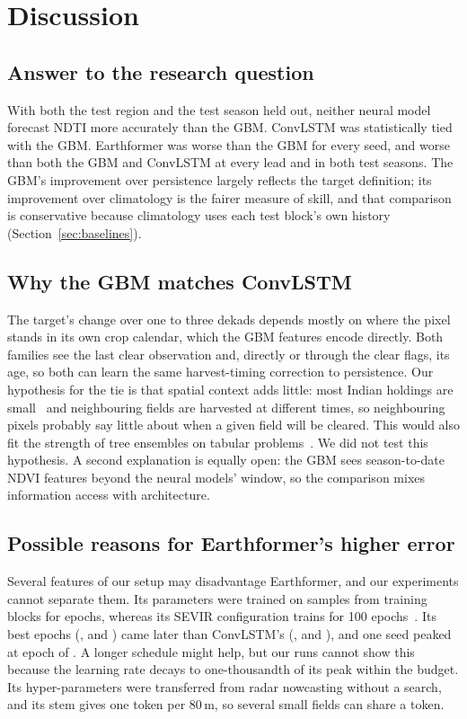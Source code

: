 \documentclass[journal]{IEEEtran}
\begin{document}
\section{Discussion}
\subsection{Answer to the research question}
With both the test region and the test season held out, neither neural model forecast NDTI more accurately than the GBM. ConvLSTM was statistically tied with the GBM. Earthformer was worse than the GBM for every seed, and worse than both the GBM and ConvLSTM at every lead and in both test seasons. The GBM's improvement over persistence largely reflects the target definition; its improvement over climatology is the fairer measure of skill, and that comparison is conservative because climatology uses each test block's own history (Section~\ref{sec:baselines}).

\subsection{Why the GBM matches ConvLSTM}
\label{sec:tie}
The target's change over one to three dekads depends mostly on where the pixel stands in its own crop calendar, which the GBM features encode directly. Both families see the last clear observation and, directly or through the clear flags, its age, so both can learn the same harvest-timing correction to persistence. Our hypothesis for the tie is that spatial context adds little: most Indian holdings are small~\cite{agcensus} and neighbouring fields are harvested at different times, so neighbouring pixels probably say little about when a given field will be cleared. This would also fit the strength of tree ensembles on tabular problems~\cite{grinsztajn}. We did not test this hypothesis. A second explanation is equally open: the GBM sees season-to-date NDVI features beyond the neural models' window, so the comparison mixes information access with architecture.

\subsection{Possible reasons for Earthformer's higher error}
\label{sec:ef}
Several features of our setup may disadvantage Earthformer, and our experiments cannot separate them. Its \finEarthformerSeedOneParams{} parameters were trained on \finxNTrainSamples{} samples from \finxNTrainBlocks{} training blocks for \finxEpochBudget{} epochs, whereas its SEVIR configuration trains for 100 epochs~\cite{earthformercode}. Its best epochs (\finEarthformerSeedOneBestEpoch, \finEarthformerSeedTwoBestEpoch{} and \finEarthformerSeedThreeBestEpoch) came later than ConvLSTM's (\finConvLSTMSeedOneBestEpoch, \finConvLSTMSeedTwoBestEpoch{} and \finConvLSTMSeedThreeBestEpoch), and one seed peaked at epoch \finEarthformerSeedThreeBestEpoch{} of \finxEpochBudget. A longer schedule might help, but our runs cannot show this because the learning rate decays to one-thousandth of its peak within the budget. Its hyper-parameters were transferred from radar nowcasting without a search, and its stem gives one token per 80\,m, so several small fields can share a token.
\end{document}
